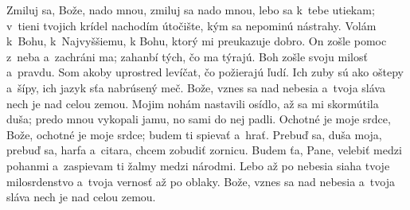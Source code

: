 Zmiluj sa, Bože, nado mnou, zmiluj sa nado mnou,
lebo sa k~tebe utiekam;
\versseparator
v~tieni tvojich krídel nachodím útočište,
kým sa nepominú nástrahy.
\versseparator
Volám k~Bohu, k~Najvyššiemu,
k Bohu, ktorý mi preukazuje dobro.
\versseparator
On zošle pomoc z~neba a~zachráni ma;
zahanbí tých, čo ma týrajú.
\versseparator
Boh zošle svoju milosť a~pravdu.
Som akoby uprostred levíčat,
čo požierajú ľudí.
\versseparator
Ich zuby sú ako oštepy a~šípy,
ich jazyk sťa nabrúsený meč.
\versseparator
Bože, vznes sa nad nebesia
a~tvoja sláva nech je nad celou zemou.
\versseparator
Mojim nohám nastavili osídlo,
až sa mi skormútila duša;
\versseparator
predo mnou vykopali jamu,
no sami do nej padli.
\versseparator
Ochotné je moje srdce, Bože,
ochotné je moje srdce;
budem ti spievať a~hrať.
\versseparator
Prebuď sa, duša moja,
prebuď sa, harfa a~citara,
chcem zobudiť zornicu.
\versseparator
Budem ťa, Pane, velebiť medzi pohanmi
a~zaspievam ti žalmy medzi národmi.
\versseparator
Lebo až po nebesia siaha tvoje milosrdenstvo
a~tvoja vernosť až po oblaky.
\versseparator
Bože, vznes sa nad nebesia
a~tvoja sláva nech je nad celou zemou.